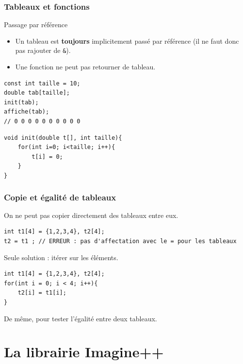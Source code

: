 \begin{frame}[fragile]
\frametitle{Tableaux et fonctions}
\begin{alertblock}{Passage par référence}
\begin{itemize}
\item Un tableau est \textbf{toujours} implicitement passé par référence (il ne faut donc pas rajouter de \texttt{\&}).
\item Une fonction ne peut pas retourner de tableau.
\end{itemize}
\end{alertblock}

\begin{minipage}{0.45\linewidth}
\begin{verbatim}
const int taille = 10;
double tab[taille];
init(tab);
affiche(tab);
// 0 0 0 0 0 0 0 0 0 0
\end{verbatim}
\end{minipage}
\hfill
\begin{minipage}{0.54\linewidth}
\begin{verbatim}
void init(double t[], int taille){
    for(int i=0; i<taille; i++){
        t[i] = 0;
    }
}
\end{verbatim}
\end{minipage}
\end{frame}

\begin{frame}[fragile]
\frametitle{Copie et égalité de tableaux}
On ne peut pas copier directement des tableaux entre eux.
\begin{verbatim}
int t1[4] = {1,2,3,4}, t2[4];
t2 = t1 ; // ERREUR : pas d'affectation avec le = pour les tableaux
\end{verbatim}

Seule solution : itérer sur les éléments.
\begin{verbatim}
int t1[4] = {1,2,3,4}, t2[4];
for(int i = 0; i < 4; i++){
    t2[i] = t1[i];
}
\end{verbatim}
De même, pour tester l'égalité entre deux tableaux.
\end{frame}

\section{La librairie Imagine++}

